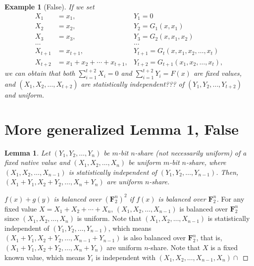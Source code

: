\documentclass[a4paper,12pt]{ctexart}
\newcommand{\F}{\mathbf{F}}
\newtheorem{example}{Example}[subsection]
\newtheorem{lemma}{Lemma}
\newtheorem{proof}{Proof}
\begin{document}
\begin{example}[False]
    If we set 
    \begin{align}
        X_1&=x_1,&Y_1=0\\
        X_2&=x_2,&Y_2=G_1(x,x_1)\\
        X_3&=x_3,&Y_3=G_2(x,x_1,x_2)\\
        \dots& &\dots\\
        X_{t+1}&=x_{t+1},&Y_{t+1}=G_t(x,x_1,x_2,\dots,x_t)\\
        X_{t+2}&=x_1+x_2+\cdots+x_{t+1},&Y_{t+2}=G_{t+1}(x_1,x_2,\dots,x_t),
    \end{align}
    we can obtain that both $\sum_{i=1}^{t+2}X_i=0$ and $\sum_{i=1}^{t+2}Y_i=F(x)$ are fixed values, and $(X_1,X_2,\dots,X_{t+2})$ are statistically independent??? of $(Y_1,Y_2,\dots,Y_{t+2})$ and uniform.
\end{example}



    \section*{More generalized Lemma 1, False}
    \begin{lemma}
        Let $(Y_1,Y_2,\dots,Y_n)$ be $m$-bit $n$-share (not necessarily uniform) of a fixed native value and $(X_1,X_2,\dots,X_n)$ be uniform $m$-bit $n$-share, where $(X_1,X_2,\dots,X_{n-1})$ is statistically independent of $(Y_1,Y_2,\dots,Y_{n-1})$. 
        Then, $(X_1 +Y_1, X_2 +Y_2,\dots, X_n + Y_n)$ are uniform $n$-share. 
    \end{lemma}
    \begin{proof}[$f(x)+g(y)$ is balanced over $(\F_2^n)^2$ if $f(x)$ is balanced over $\F_2^n$]
        For any fixed value $X=X_1+X_2+\cdots+X_n$, $(X_1,X_2,\dots,X_{n-1})$ is balanced over $\F_2^n$ since $(X_1,X_2,\dots,X_n)$ is uniform. 
        Note that $(X_1,X_2,\dots,X_{n-1})$ is statistically independent of $(Y_1,Y_2,\dots,Y_{n-1})$, which means $(X_1+Y_1,X_2+Y_2,\dots,X_{n-1}+Y_{n-1})$ is also balanced over $\F_2^n$, that is, $(X_1 +Y_1, X_2 +Y_2,\dots, X_n + Y_n)$ are uniform $n$-share.
        Note that $X$ is a fixed known value, which means $Y_i$ is independent with $(X_1,X_2,\dots,X_{n-1},X_n)\cap$  
    \end{proof}
\end{document}
